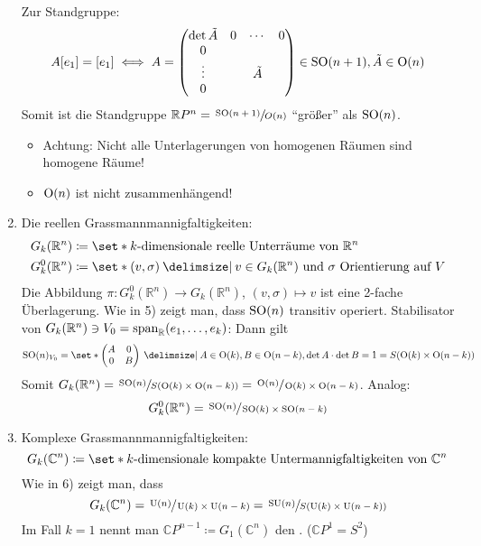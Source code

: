 \begin{beispiel*}
\begin{enumerate}[1)]
		Zur Standgruppe: 
		\[
			A [e_1] = [e_1] \iff A= \begin{pmatrix}
				\det \tilde{A} & 0 & \cdots & 0 \\
				0 & & & \\
				\vdots & & \tilde{A} & \\
				0 & & & 
			\end{pmatrix}\in \operatorname{SO}(n+1) , \tilde{A} \in \operatorname{O}(n)
		\]
		Somit ist die Standgruppe $\mathbb{R}P^n = \sfrac{\operatorname{SO}(n+1)}{O(n)}$ \enquote{größer} als $\operatorname{SO}(n)$.
		\begin{itemize}
			\item Achtung: Nicht alle Unterlagerungen von homogenen Räumen sind homogene Räume!
			\item $\operatorname{O}(n)$ ist nicht zusammenhängend!
		\end{itemize}
		\item Die reellen Grassmannmannigfaltigkeiten: 
		\begin{align}
			G_k (\mathbb{R}^n) &\coloneqq \set*{\text{$k$-dimensionale reelle Unterräume von $\mathbb{R}^n$}} \\
			G_k^0(\mathbb{R}^n) &\coloneqq \set*{(v,\sigma) \given v \in G_k(\mathbb{R}^n)} \text{ und $\sigma$ Orientierung auf $V$} 
		\end{align}
		Die Abbildung $\pi \colon G_k^0(\mathbb{R}^n) \to G_k(\mathbb{R}^n)$, $(v,\sigma) \mapsto v$ ist eine 2-fache Überlagerung.
		Wie in 5) zeigt man, dass $\operatorname{SO}(n)$ transitiv operiert.
		Stabilisator von $G_k(\mathbb{R}^n)\ni V_0 = \operatorname{span}_\mathbb{R}(e_1, \ldots ,e_k)$:
		Dann gilt 
		\[
			\SO(n)_{V_0} = \set*{ \begin{pmatrix}
				A & 0 \\ 0 & B
			\end{pmatrix} \given A \in \On(k), B \in \On(n-k), \det A \cdot \det B = 1} = S \enbrace*{\On(k) \times \On(n-k)}
		\]
		Somit $G_k(\mathbb{R}^n) = \sfrac{\SO(n)}{S \enbrace*{\On(k) \times \On(n-k)}} = \sfrac{\On(n)}{\On(k) \times \On(n-k)}$.
		Analog:
		\[
			G_k^0(\mathbb{R}^n) = \sfrac{\operatorname{SO}(n)}{\operatorname{SO}(k) \times \operatorname{SO}(n-k)}
		\]
		\item Komplexe Grassmannmannigfaltigkeiten: 
		\[
			G_k(\mathbb{C}^n) \coloneqq \set*{\text{$k$-dimensionale kompakte Untermannigfaltigkeiten von $\mathbb{C}^n$} }
		\]
		Wie in 6) zeigt man, dass 
		\[
			G_k(\mathbb{C}^n) = \sfrac{\operatorname{U}(n)}{\operatorname{U}(k) \times \operatorname{U}(n-k)} = \sfrac{\operatorname{SU}(n)}{S(\operatorname{U}(k) \times \operatorname{U}(n-k))}
		\]
		Im Fall $k=1$ nennt man $\mathbb{C}P^{n-1} \coloneqq G_1(\mathbb{C}^n)$ den . ($\mathbb{C}P^1 = S^2$) 

\end{enumerate}
\end{beispiel*}
